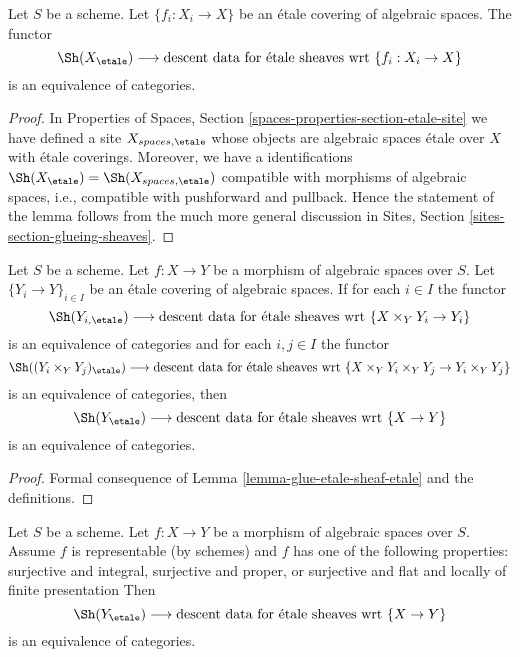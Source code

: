 \begin{lemma}
\label{lemma-glue-etale-sheaf-etale}
Let $S$ be a scheme. Let $\{f_i : X_i \to X\}$ be an \'etale covering of
algebraic spaces. The functor
$$
\Sh(X_\etale)
\longrightarrow
\text{descent data for \'etale sheaves wrt }\{f_i : X_i \to X\}
$$
is an equivalence of categories.
\end{lemma}

\begin{proof}
In Properties of Spaces, Section \ref{spaces-properties-section-etale-site}
we have defined a site $X_{spaces, \etale}$ whose objects
are algebraic spaces \'etale over $X$ with \'etale coverings.
Moreover, we have a identifications
$\Sh(X_\etale) = \Sh(X_{spaces, \etale})$ compatible
with morphisms of algebraic spaces, i.e., compatible with
pushforward and pullback. Hence the statement of the lemma follows
from the much more general discussion in
Sites, Section \ref{sites-section-glueing-sheaves}.
\end{proof}

\begin{lemma}
\label{lemma-reduce-to-scheme-base}
Let $S$ be a scheme. Let $f : X \to Y$ be a morphism of
algebraic spaces over $S$. Let $\{Y_i \to Y\}_{i \in I}$ be an \'etale
covering of algebraic spaces. If for each $i \in I$ the functor
$$
\Sh(Y_{i, \etale})
\longrightarrow
\text{descent data for \'etale sheaves wrt }\{X \times_Y Y_i \to Y_i\}
$$
is an equivalence of categories and for each $i, j \in I$ the functor
$$
\Sh((Y_i \times_Y Y_j)_\etale)
\longrightarrow
\text{descent data for \'etale sheaves wrt }
\{X \times_Y Y_i \times_Y Y_j \to Y_i \times_Y Y_j\}
$$
is an equivalence of categories, then
$$
\Sh(Y_\etale)
\longrightarrow
\text{descent data for \'etale sheaves wrt }\{X \to Y\}
$$
is an equivalence of categories.
\end{lemma}

\begin{proof}
Formal consequence of Lemma \ref{lemma-glue-etale-sheaf-etale}
and the definitions.
\end{proof}

\begin{lemma}
\label{lemma-representable-case}
Let $S$ be a scheme. Let $f : X \to Y$ be a morphism of algebraic spaces
over $S$. Assume $f$ is representable (by schemes) and $f$
has one of the following properties:
surjective and integral,
surjective and proper, or
surjective and flat and locally of finite presentation
Then 
$$
\Sh(Y_\etale)
\longrightarrow
\text{descent data for \'etale sheaves wrt }\{X \to Y\}
$$
is an equivalence of categories.
\end{lemma}

